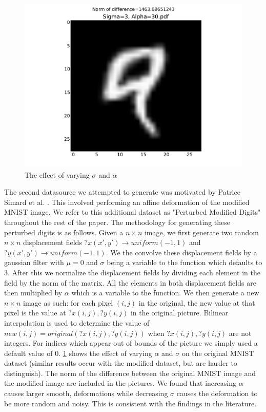 \documentclass[conference]{IEEEtran}
\begin{document}
\begin{figure}[h]
	\includegraphics[scale=0.20]{Sigma=3,Alpha=30.pdf}
	\caption{The effect of varying $\sigma$ and $\alpha$}
	\label{Perturbed}
\end{figure}

The second datasource we attempted to generate was motivated by Patrice Simard et al. \cite{Simard}. This involved performing an affine deformation of the modified MNIST image. We refer to this additional dataset as "Perturbed Modified Digits" throughout the rest of the paper. The methodology for generating these perturbed digits is as follows. Given a $n\times n$ image, we first generate two random $n\times n$ displacement fields $?x(x',y')\rightarrow uniform(-1,1)$ and $?y(x',y')\rightarrow uniform(-1,1)$. We the convolve these displacement fields by a gaussian filter with $\mu = 0$ and $\sigma$ being a variable to the function which defaults to 3. After this we normalize the displacement fields by dividing each element in the field by the norm of the matrix. All the elements in both displacement fields are then multiplied by $\alpha$ which is a variable to the function. We then generate a new $n\times n$ image as such: for each pixel $(i,j)$ in the original, the new value at that pixel is the value at $?x(i,j),?y(i,j)$ in the original picture. Bilinear interpolation is used to determine the value of $new(i,j)=original(?x(i,j),?y(i,j))$ when $?x(i,j),?y(i,j)$ are not integers. For indices which appear out of bounds of the picture we simply used a default value of 0. \ref{Perturbed} shows the effect of varying $\alpha$ and $\sigma$ on the original MNIST dataset (similar results occur with the modified dataset, but are harder to distinguish). The norm of the difference between the original MNIST image and the modified image are included in the pictures. We found that increasing $\alpha$ causes larger smooth, deformations while decreasing $\sigma$ causes the deformation to be more random and noisy. This is consistent with the findings in the literature.
\end{document}
